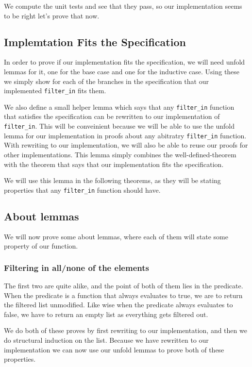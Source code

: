 \documentclass{article}
\begin{document}
We compute the unit tests and see that they pass, so our implementation seems to be right let's prove that now.

\subsection{Implemtation Fits the Specification}
In order to prove if our implementation fits the specification, we will need unfold lemmas for it, one for the base case and one for the inductive case. Using these we simply show for each of the branches in the specification that our implemented \texttt{filter\_in} fits them.

We also define a small helper lemma which says that any \texttt{filter\_in} function that satisfies the specification can be rewritten to our implementation of \texttt{filter\_in}. This will be conveinient because we will be able to use the unfold lemma for our implementation in proofs about any abitratry \texttt{filter\_in} function. With rewriting to our implementation, we will also be able to reuse our proofs for other implementations. This lemma simply combines the well-defined-theorem with the theorem that says that our implementation fits the specification.

We will use this lemma in the following theorems, as they will be stating properties that any \texttt{filter\_in} function should have.

\subsection{About lemmas}
We will now prove some about lemmas, where each of them will state some property of our function. 

\subsubsection{Filtering in all/none of the elements}
The first two are quite alike, and the point of both of them lies in the predicate. When the predicate is a function that always evaluates to true, we are to return the filtered list unmodified. Like wise when the predicate always evaluates to false, we have to return an empty list as everything gets filtered out.

We do both of these proves by first rewriting to our implementation, and then we do structural induction on the list. Because we have rewritten to our implementation we can now use our unfold lemmas to prove both of these properties.
\end{document}
